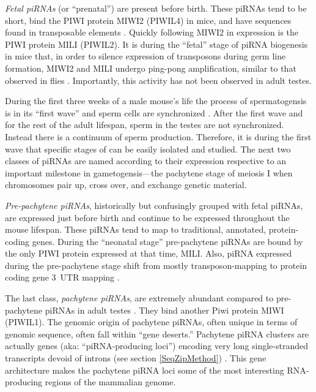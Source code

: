     \textit{Fetal piRNAs} (or ``prenatal'') are present before birth. These piRNAs tend to be short, bind the PIWI protein MIWI2 (PIWIL4) in mice, and have sequences found in transposable elements \citep{Carmell2007}. Quickly following MIWI2 in expression is the PIWI protein MILI (PIWIL2). It is during the ``fetal'' stage of piRNA biogenesis in mice that, in order to silence expression of transposons during germ line formation, MIWI2 and MILI undergo ping-pong amplification, similar to that observed in flies \citep{Kuramochi-Miyagawa2004, Aravin2006, Aravin2008a,Aravin2008}. Importantly, this activity has not been observed in adult testes.

    During the first three weeks of a male mouse's life the process of spermatogensis is in its ``first wave'' and sperm cells are synchronized \citep{Oakberg1956b, Laiho2013a}. After the first wave and for the rest of the adult lifespan, sperm in the testes are not synchronized. Instead there is a continuum of sperm production. Therefore, it is during the first wave that specific stages of can be easily isolated and studied. The next two classes of piRNAs are named according to their expression respective to an important milestone in gametogensis---the pachytene stage of meiosis I when chromosomes pair up, cross over, and exchange genetic material.

    \textit{Pre-pachytene piRNAs}, historically but confusingly grouped with fetal piRNAs, are expressed just before birth and continue to be expressed throughout the mouse lifespan. These piRNAs tend to map to traditional, annotated, protein-coding genes. During the ``neonatal stage'' pre-pachytene piRNAs are bound by the only PIWI protein expressed at that time, MILI. Also, piRNA expressed during the pre-pachytene stage shift from mostly transposon-mapping to protein coding gene 3\textprime~UTR mapping \citep{Robine2009}.

    The last class, \textit{pachytene piRNAs}, are extremely abundant compared to pre-pachytene piRNAs in adult testes \citep{Girard2006, Lau2006, Li2013h}. They bind another Piwi protein MIWI (PIWIL1). The genomic origin of pachytene piRNAs, often unique in terms of genomic sequence, often fall within ``gene deserts.'' Pachytene piRNA clusters are actually genes (aka: ``piRNA-producing loci'') encoding very long single-stranded transcripts devoid of introns (see section \ref{SeqZipMethod}) \citep{Li2013h}. This gene architecture makes the pachytene piRNA loci some of the most interesting RNA-producing regions of the mammalian genome.

